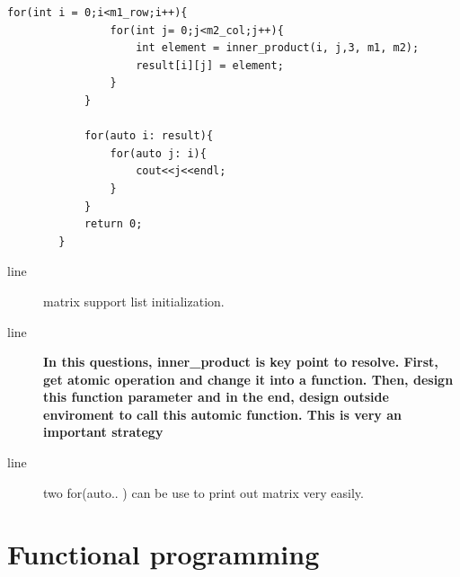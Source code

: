 \documentclass[a4paper,11pt,twoside]{book}
\begin{document}
\begin{itemize}
\begin{lstlisting}[numbers=none]
			for(int i = 0;i<m1_row;i++){
				for(int j= 0;j<m2_col;j++){
					int element = inner_product(i, j,3, m1, m2); 
					result[i][j] = element;
				}
			}
			
			for(auto i: result){
				for(auto j: i){
					cout<<j<<endl;
				}
			}
			return 0;
		}
	\end{lstlisting}
	
	\begin{description}
		\item[line ] matrix support list initialization.
		
		\item[line ] \textbf{In this questions, inner\_product is key point to resolve. First, get atomic operation and change it into a function. Then, design this function parameter and in the end, design outside enviroment to call this automic function. This is very an important strategy} 
		
		\item[line ] two for(auto.. ) can be use to print out matrix very easily.
	\end{description}
	
\end{itemize}


\chapter{Functional programming}
\end{document}
